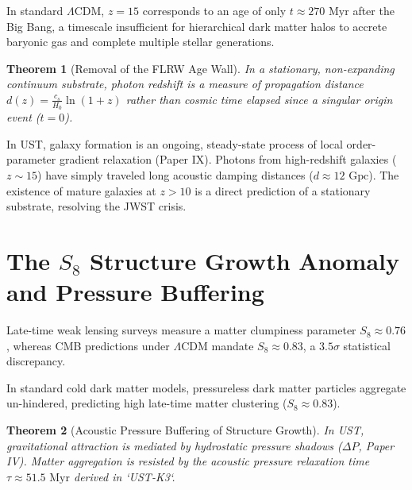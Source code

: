 \documentclass[11pt,a4paper]{article}
\newtheorem{thm}{Theorem}
\begin{document}
	In standard $\Lambda\text{CDM}$, $z = 15$ corresponds to an age of only $t \approx 270 \text{ Myr}$ after the Big Bang, a timescale insufficient for hierarchical dark matter halos to accrete baryonic gas and complete multiple stellar generations.
	
	\begin{thm}[Removal of the FLRW Age Wall]
		\label{thm:jwst_resolution}
		In a stationary, non-expanding continuum substrate, photon redshift is a measure of propagation distance $d(z) = \frac{c_s}{H_0} \ln(1+z)$ rather than cosmic time elapsed since a singular origin event ($t = 0$).
	\end{thm}
	
	In UST, galaxy formation is an ongoing, steady-state process of local order-parameter gradient relaxation (Paper IX). Photons from high-redshift galaxies ($z \sim 15$) have simply traveled long acoustic damping distances ($d \approx 12 \text{ Gpc}$). The existence of mature galaxies at $z > 10$ is a direct prediction of a stationary substrate, resolving the JWST crisis.
	
	\section{The $S_8$ Structure Growth Anomaly and Pressure Buffering}
	\label{sec:s8_anomaly}
	
	Late-time weak lensing surveys measure a matter clumpiness parameter $S_8 \approx 0.76$, whereas CMB predictions under $\Lambda\text{CDM}$ mandate $S_8 \approx 0.83$, a $3.5\sigma$ statistical discrepancy.
	
	In standard cold dark matter models, pressureless dark matter particles aggregate un-hindered, predicting high late-time matter clustering ($S_8 \approx 0.83$).
	
	\begin{thm}[Acoustic Pressure Buffering of Structure Growth]
		\label{thm:s8_resolution}
		In UST, gravitational attraction is mediated by hydrostatic pressure shadows ($\Delta P$, Paper IV). Matter aggregation is resisted by the acoustic pressure relaxation time $\tau \approx 51.5 \text{ Myr}$ derived in `UST-K3`.
	\end{thm}
	
\end{document}
